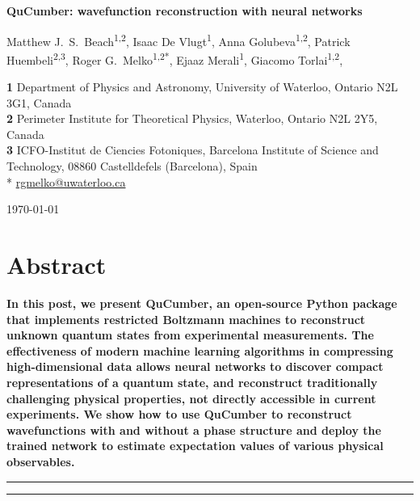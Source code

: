 \documentclass[submission, Phys, hidelnks]{SciPost}
\newcommand{\red}[1]{{\color{red} #1}}
\begin{document}
\begin{center}{\Large \textbf{
    QuCumber: wavefunction reconstruction with neural networks
}}\end{center}

\begin{center}
    Matthew J.~S.~Beach\textsuperscript{1,2},
    Isaac De Vlugt\textsuperscript{1},
    Anna Golubeva\textsuperscript{1,2},
    Patrick Huembeli\textsuperscript{2,3},
    Roger G.~Melko\textsuperscript{1,2*},
    Ejaaz Merali\textsuperscript{1},
    Giacomo Torlai\textsuperscript{1,2},
\end{center}

\begin{center}
    {\bf 1} 
    Department of Physics and Astronomy, University of Waterloo,
    Ontario N2L 3G1, Canada
    \\
    {\bf 2} Perimeter Institute for Theoretical Physics, Waterloo,
    Ontario N2L 2Y5, Canada
    \\
    {\bf 3} ICFO-Institut de Ciencies Fotoniques, Barcelona Institute of Science and Technology,
    08860 Castelldefels (Barcelona), Spain\\

    * \href{mailto:rgmelko@uwaterloo.ca}{rgmelko@uwaterloo.ca} \\
\end{center}

\begin{center}
    \today
\end{center}


\section*{Abstract}
{\bf
    \red{
        In this post, we present QuCumber, an open-source Python package that implements restricted Boltzmann machines to reconstruct unknown quantum states from experimental measurements. The effectiveness of modern machine learning algorithms in compressing high-dimensional data allows neural networks to discover compact representations of a quantum state, and reconstruct traditionally challenging physical properties, not directly accessible in current experiments. We show how to use QuCumber to reconstruct wavefunctions with and without a phase structure and deploy the trained network to estimate expectation values of various physical observables.
    }
}

\vspace{10pt}
\noindent\rule{\textwidth}{1pt}
\tableofcontents\thispagestyle{fancy}
\noindent\rule{\textwidth}{1pt}
\vspace{10pt}
\end{document}
